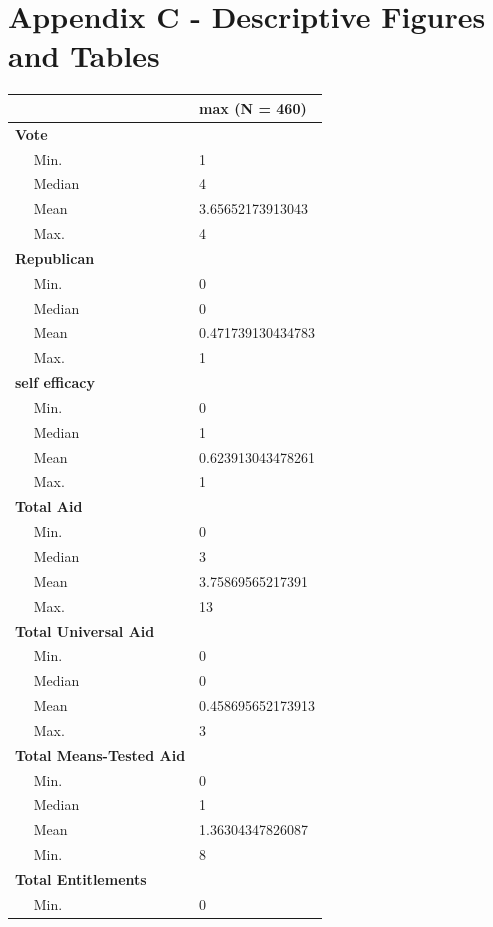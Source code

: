 \documentclass[12pt]{paper}
\begin{document}
\section*{Appendix C - Descriptive Figures and Tables}

\begin{table}
\begin{tabular}{l|l}
	\hline
	& max (N = 460)\\
	\hline
	\bf{Vote} & ~\\
	\hline
	~~ Min. & 1\\
	\hline
	~~ Median & 4\\
	\hline
	~~ Mean & 3.65652173913043\\
	\hline
	~~ Max. & 4\\
	\hline
	\bf{Republican} & ~\\
	\hline
	~~ Min. & 0\\
	\hline
	~~ Median & 0\\
	\hline
	~~ Mean & 0.471739130434783\\
	\hline
	~~ Max. & 1\\
	\hline
	\bf{self efficacy} & ~\\
	\hline
	~~ Min. & 0\\
	\hline
	~~ Median & 1\\
	\hline
	~~ Mean & 0.623913043478261\\
	\hline
	~~ Max. & 1\\
	\hline
	\bf{Total Aid} & ~\\
	\hline
	~~ Min. & 0\\
	\hline
	~~ Median & 3\\
	\hline
	~~ Mean & 3.75869565217391\\
	\hline
	~~ Max. & 13\\
	\hline
	\bf{Total Universal Aid} & ~\\
	\hline
	~~ Min. & 0\\
	\hline
	~~ Median & 0\\
	\hline
	~~ Mean & 0.458695652173913\\
	\hline
	~~ Max. & 3\\
	\hline
	\bf{Total Means-Tested Aid} & ~\\
	\hline
	~~ Min. & 0\\
	\hline
	~~ Median & 1\\
	\hline
	~~ Mean & 1.36304347826087\\
	\hline
	~~ Min. & 8\\
	\hline
	\bf{Total Entitlements} & ~\\
	\hline
	~~ Min. & 0\\

\end{tabular}
\end{table}
\end{document}
